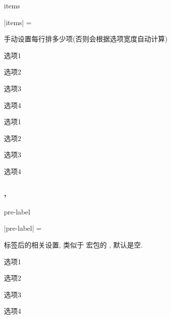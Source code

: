\documentclass{xdyy-usermanual}
\begin{document}
\begin{function}{items}
  \begin{syntax}
    |items| = 
  \end{syntax}
  手动设置每行排多少项(否则会根据选项宽度自动计算)
\end{function}
\begin{vexample}
    \begin{xchoices}
      \item 选项1
      \item 选项2
      \item 选项3
      \item 选项4
    \end{xchoices}
\end{vexample}
\begin{vexample}
    \begin{xchoices}[items = 2]
      \item 选项1
      \item 选项2
      \item 选项3
      \item 选项4
    \end{xchoices}
\end{vexample}



\subsubsection{ ,  }


\begin{function}{pre-label}
  \begin{syntax}
    |pre-label| =  \init{{}}
  \end{syntax}
  标签后的相关设置, 类似于  宏包的 , 默认是空. 
\end{function}
\begin{vexample}
    \begin{xchoices}[pre-label = {(}]
      \item 选项1
      \item 选项2
      \item 选项3
      \item 选项4
    \end{xchoices}
\end{vexample}
\end{document}
